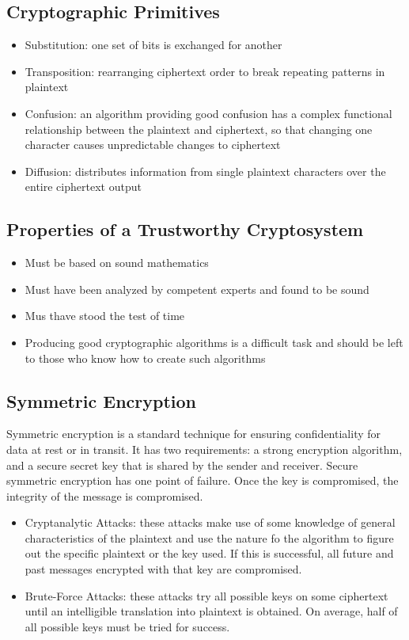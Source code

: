 \documentclass{math}
\begin{document}
\subsection*{Cryptographic Primitives}
\begin{itemize}
  \item Substitution: one set of bits is exchanged for another
  \item Transposition: rearranging ciphertext order to break repeating patterns
  in plaintext
  \item Confusion: an algorithm providing good confusion has a complex
  functional relationship between the plaintext and ciphertext, so that changing
  one character causes unpredictable changes to ciphertext
  \item Diffusion: distributes information from single plaintext characters over
  the entire ciphertext output
\end{itemize}

\subsection*{Properties of a Trustworthy Cryptosystem}
\begin{itemize}
  \item Must be based on sound mathematics
  \item Must have been analyzed by competent experts and found to be sound
  \item Mus thave stood the test of time
  \item Producing good cryptographic algorithms is a difficult task and
  should be left to those who know how to create such algorithms
\end{itemize}

\subsection*{Symmetric Encryption}
Symmetric encryption is a standard technique for ensuring confidentiality for
data at rest or in transit. It has two requirements: a strong encryption
algorithm, and a secure secret key that is shared by the sender and receiver.
Secure symmetric encryption has one point of failure. Once the key is
compromised, the integrity of the message is compromised.
\begin{itemize}
  \item Cryptanalytic Attacks: these attacks make use of some knowledge of
  general characteristics of the plaintext and use the nature fo the algorithm
  to figure out the specific plaintext or the key used. If this is successful,
  all future and past messages encrypted with that key are compromised.
  \item Brute-Force Attacks: these attacks try all possible keys on some
  ciphertext until an intelligible translation into plaintext is obtained. On
  average, half of all possible keys must be tried for success.
\end{itemize}
\end{document}
